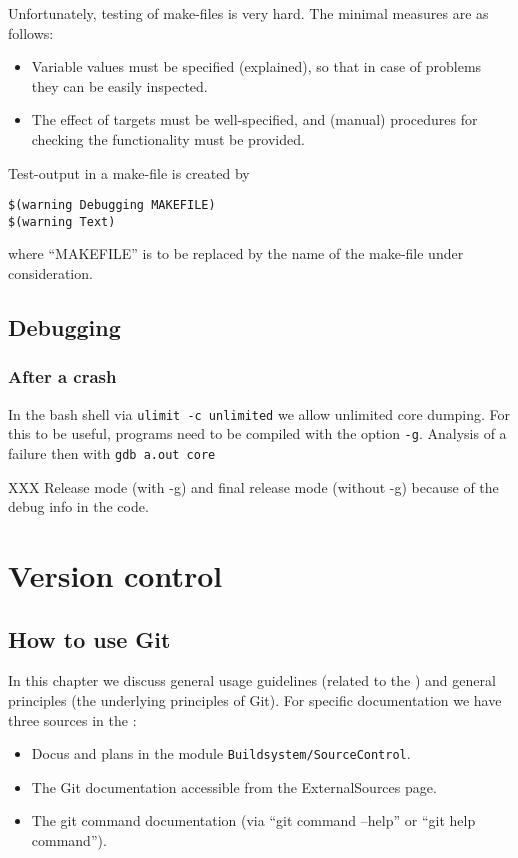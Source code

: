 \documentclass{book}
\begin{document}
Unfortunately, testing of make-files is very hard. The minimal measures are as follows:
\begin{itemize}
\item Variable values must be specified (explained), so that in case of problems they can be easily inspected.
\item The effect of targets must be well-specified, and (manual) procedures for checking the functionality must be provided.
\end{itemize}

Test-output in a make-file is created by
\begin{verbatim}
$(warning Debugging MAKEFILE)
$(warning Text)
\end{verbatim}
where ``MAKEFILE'' is to be replaced by the name of the make-file under consideration.






\chapter{Debugging}
\label{cha:debug}


\section{After a crash}
\label{sec:debugafter}

In the bash shell via \texttt{ulimit -c unlimited} we allow unlimited core dumping. For this to be useful, programs need to be compiled with the option \texttt{-g}. Analysis of a failure then with
\texttt{gdb a.out core}

XXX Release mode (with -g) and final release mode (without -g) because of the debug info in the code.






\part{Version control}
\label{par:Versioncontrol}



\chapter{How to use Git}
\label{cha:HowGit}

In this chapter we discuss general usage guidelines (related to the \OKlibrary) and general principles (the underlying principles of Git). For specific documentation we have three sources in the \OKlibrary:
\begin{itemize}
\item Docus and plans in the module \texttt{Buildsystem/SourceControl}.
\item The Git documentation accessible from the ExternalSources page.
\item The git command documentation (via ``git command --help'' or ``git help command'').
\end{itemize}
\end{document}
